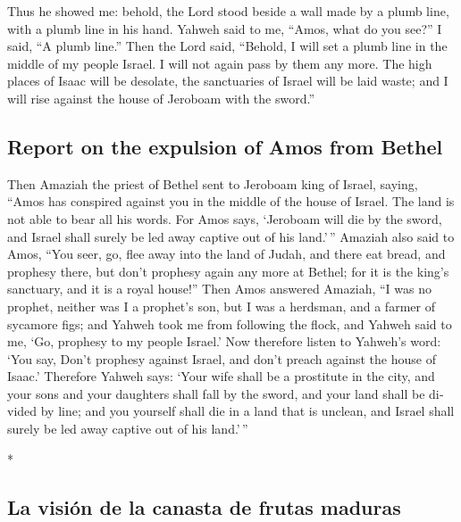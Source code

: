 \begin{paracol}{2}
\begin{otherlanguage}{english}
 Thus he showed me: behold, the Lord stood beside a wall
made by a plumb line, with a plumb line in his hand. 
Yahweh said to me, ``Amos, what do you see?'' I said, ``A plumb line.''
Then the Lord said, ``Behold, I will set a plumb line in the middle of
my people Israel. I will not again pass by them any more. 
The high places of Isaac will be desolate, the sanctuaries of Israel
will be laid waste; and I will rise against the house of Jeroboam with
the sword.''

\hypertarget{report-on-the-expulsion-of-amos-from-bethel}{%
\subsection{Report on the expulsion of Amos from
Bethel}\label{report-on-the-expulsion-of-amos-from-bethel}}

 Then Amaziah the priest of Bethel sent to Jeroboam king
of Israel, saying, ``Amos has conspired against you in the middle of the
house of Israel. The land is not able to bear all his words.
 For Amos says, `Jeroboam will die by the sword, and
Israel shall surely be led away captive out of his land.'\,''
 Amaziah also said to Amos, ``You seer, go, flee away
into the land of Judah, and there eat bread, and prophesy there,
 but don't prophesy again any more at Bethel; for it is
the king's sanctuary, and it is a royal house!''  Then
Amos answered Amaziah, ``I was no prophet, neither was I a prophet's
son, but I was a herdsman, and a farmer of sycamore figs;
 and Yahweh took me from following the flock, and Yahweh
said to me, `Go, prophesy to my people Israel.'  Now
therefore listen to Yahweh's word: `You say, Don't prophesy against
Israel, and don't preach against the house of Isaac.' 
Therefore Yahweh says: `Your wife shall be a prostitute in the city, and
your sons and your daughters shall fall by the sword, and your land
shall be divided by line; and you yourself shall die in a land that is
unclean, and Israel shall surely be led away captive out of his
land.'\,''

\end{otherlanguage}

\switchcolumn[0]*

\hypertarget{la-visiuxf3n-de-la-canasta-de-frutas-maduras}{%
\subsection{La visión de la canasta de frutas
maduras}\label{la-visiuxf3n-de-la-canasta-de-frutas-maduras}}


\end{paracol}
